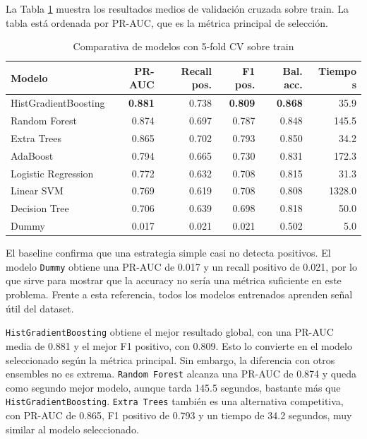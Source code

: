 \documentclass[11pt,a4paper]{article}
\begin{document}
La Tabla \ref{tab_cv} muestra los resultados medios de validación cruzada sobre train. La tabla está ordenada por PR-AUC, que es la métrica principal de selección.

\begin{table}[H]
\centering
\caption{Comparativa de modelos con 5-fold CV sobre train}
\label{tab_cv}
\small
\begin{tabular}{@{}lrrrrr@{}}
\toprule
\textbf{Modelo} & \textbf{PR-AUC} & \textbf{Recall pos.} & \textbf{F1 pos.} & \textbf{Bal. acc.} & \textbf{Tiempo s}\\
\midrule
\rowcolor{bestrow} HistGradientBoosting & \textbf{0.881} & 0.738 & \textbf{0.809} & \textbf{0.868} & 35.9\\
Random Forest & 0.874 & 0.697 & 0.787 & 0.848 & 145.5\\
Extra Trees & 0.865 & 0.702 & 0.793 & 0.850 & 34.2\\
AdaBoost & 0.794 & 0.665 & 0.730 & 0.831 & 172.3\\
Logistic Regression & 0.772 & 0.632 & 0.708 & 0.815 & 31.3\\
Linear SVM & 0.769 & 0.619 & 0.708 & 0.808 & 1328.0\\
Decision Tree & 0.706 & 0.639 & 0.698 & 0.818 & 50.0\\
\rowcolor{worstrow} Dummy & 0.017 & 0.021 & 0.021 & 0.502 & 5.0\\
\bottomrule
\end{tabular}
\end{table}

El baseline confirma que una estrategia simple casi no detecta positivos. El modelo \texttt{Dummy} obtiene una PR-AUC de 0.017 y un recall positivo de 0.021, por lo que sirve para mostrar que la accuracy no sería una métrica suficiente en este problema. Frente a esta referencia, todos los modelos entrenados aprenden señal útil del dataset.

\texttt{HistGradientBoosting} obtiene el mejor resultado global, con una PR-AUC media de 0.881 y el mejor F1 positivo, con 0.809. Esto lo convierte en el modelo seleccionado según la métrica principal. Sin embargo, la diferencia con otros ensembles no es extrema. \texttt{Random Forest} alcanza una PR-AUC de 0.874 y queda como segundo mejor modelo, aunque tarda 145.5 segundos, bastante más que \texttt{HistGradientBoosting}. \texttt{Extra Trees} también es una alternativa competitiva, con PR-AUC de 0.865, F1 positivo de 0.793 y un tiempo de 34.2 segundos, muy similar al modelo seleccionado.
\end{document}

